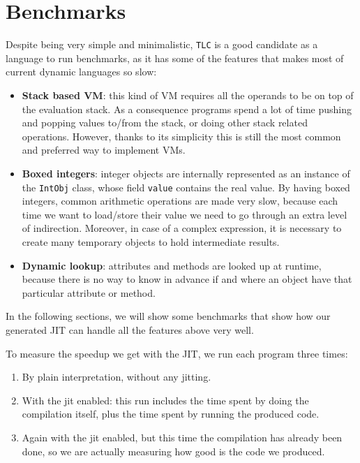 \section{Benchmarks}


Despite being very simple and minimalistic, \lstinline{TLC} is a good
candidate as a language to run benchmarks, as it has some of the features that
makes most of current dynamic languages so slow:

\begin{itemize}

\item \textbf{Stack based VM}: this kind of VM requires all the operands to be
  on top of the evaluation stack.  As a consequence programs spend a lot of
  time pushing and popping values to/from the stack, or doing other stack
  related operations.  However, thanks to its simplicity this is still the
  most common and preferred way to implement VMs.

\item \textbf{Boxed integers}: integer objects are internally represented as
  an instance of the \lstinline{IntObj} class, whose field \lstinline{value}
  contains the real value.  By having boxed integers, common arithmetic
  operations are made very slow, because each time we want to load/store their
  value we need to go through an extra level of indirection.  Moreover, in
  case of a complex expression, it is necessary to create many temporary
  objects to hold intermediate results.

\item \textbf{Dynamic lookup}: attributes and methods are looked up at
  runtime, because there is no way to know in advance if and where an object
  have that particular attribute or method.
\end{itemize}

In the following sections, we will show some benchmarks that show how our
generated JIT can handle all the features above very well.

To measure the speedup we get with the JIT, we run each program three times:

\begin{enumerate}
\item By plain interpretation, without any jitting.
\item With the jit enabled: this run includes the time spent by doing the
  compilation itself, plus the time spent by running the produced code.
\item Again with the jit enabled, but this time the compilation has already
  been done, so we are actually measuring how good is the code we produced.
\end{enumerate}


